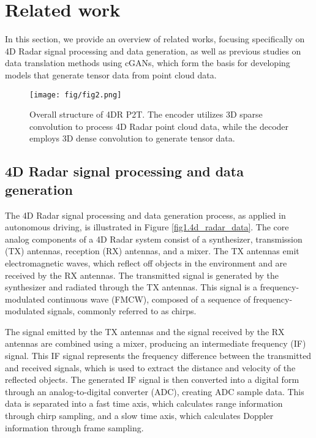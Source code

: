 \section{Related work}
\label{sec:related_works}
In this section, we provide an overview of related works, focusing specifically on 4D Radar signal processing and data generation, as well as previous studies on data translation methods using cGANs, which form the basis for developing models that generate tensor data from point cloud data.

\begin{figure*}[!th]
    \centering
    \vspace{1mm} %
    \texttt{[image: fig/fig2.png]} 
    \caption{Overall structure of 4DR P2T. The encoder utilizes 3D sparse convolution to process 4D Radar point cloud data, while the decoder employs 3D dense convolution to generate tensor data.}
    \label{fig2.model}
\end{figure*}

\subsection{4D Radar signal processing and data generation}
The 4D Radar signal processing and data generation process, as applied in autonomous driving, is illustrated in Figure \ref{fig1.4d_radar_data}. The core analog components of a 4D Radar system consist of a synthesizer, transmission (TX) antennas, reception (RX) antennas, and a mixer. The TX antennas emit electromagnetic waves, which reflect off objects in the environment and are received by the RX antennas. The transmitted signal is generated by the synthesizer and radiated through the TX antennas. This signal is a frequency-modulated continuous wave (FMCW), composed of a sequence of frequency-modulated signals, commonly referred to as chirps.

The signal emitted by the TX antennas and the signal received by the RX antennas are combined using a mixer, producing an intermediate frequency (IF) signal. This IF signal represents the frequency difference between the transmitted and received signals, which is used to extract the distance and velocity of the reflected objects. The generated IF signal is then converted into a digital form through an analog-to-digital converter (ADC), creating ADC sample data. This data is separated into a fast time axis, which calculates range information through chirp sampling, and a slow time axis, which calculates Doppler information through frame sampling.

